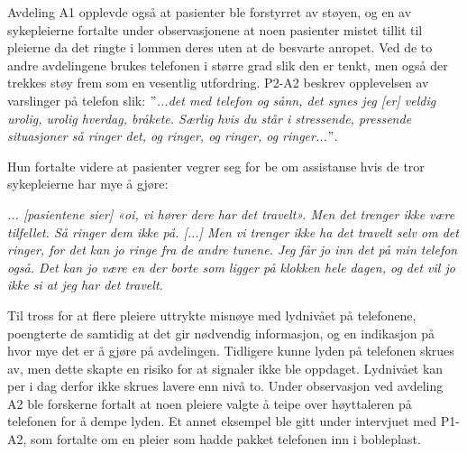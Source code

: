 \noindent
Avdeling A1 opplevde også at pasienter ble forstyrret av støyen, og en av sykepleierne fortalte under observasjonene at noen pasienter mistet tillit til pleierne da det ringte i lommen deres uten at de besvarte anropet. Ved de to andre avdelingene brukes telefonen i større grad slik den er tenkt, men også der trekkes støy frem som en vesentlig utfordring. P2-A2 beskrev opplevelsen av varslinger på telefon slik: \textit{ $"$...det med telefon og sånn, det synes jeg [er] veldig urolig, urolig hverdag, bråkete. Særlig hvis du står i stressende, pressende situasjoner så ringer det, og ringer, og ringer, og ringer...$"$}. 

\noindent
Hun fortalte videre at pasienter vegrer seg for be om assistanse hvis de tror sykepleierne har mye å gjøre:

\noindent
\textit{... [pasientene sier] «oi, vi hører dere har det travelt». Men det trenger ikke være tilfellet. Så ringer dem ikke på. [...] Men vi trenger ikke ha det travelt selv om det ringer, for det kan jo ringe fra de andre tunene. Jeg får jo inn det på min telefon også. Det kan jo være en der borte som ligger på klokken hele dagen, og det vil jo ikke si at jeg har det travelt.}

\noindent
Til tross for at flere pleiere uttrykte misnøye med lydnivået på telefonene, poengterte de samtidig at det gir nødvendig informasjon, og en indikasjon på hvor mye det er å gjøre på avdelingen. Tidligere kunne lyden på telefonen skrues av, men dette skapte en risiko for at signaler ikke ble oppdaget. Lydnivået kan per i dag derfor ikke skrues lavere enn nivå to. Under observasjon ved avdeling A2 ble forskerne fortalt at noen pleiere valgte å teipe over høyttaleren på telefonen for å dempe lyden. Et annet eksempel ble gitt under intervjuet med P1-A2, som fortalte om en pleier som hadde pakket telefonen inn i bobleplast.

